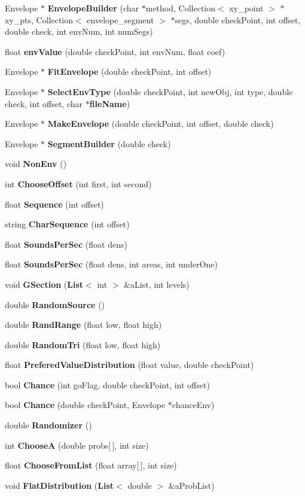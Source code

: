 \begin{CompactItemize}
\item 
Envelope $\ast$ {\bf Envelope\-Builder} (char $\ast$method, Collection$<$ xy\_\-point $>$ $\ast$xy\_\-pts, Collection$<$ envelope\_\-segment $>$ $\ast$segs, double check\-Point, int offset, double check, int env\-Num, int num\-Segs)
\item 
float {\bf env\-Value} (double check\-Point, int env\-Num, float coef)
\item 
Envelope $\ast$ {\bf Fit\-Envelope} (double check\-Point, int offset)
\item 
Envelope $\ast$ {\bf Select\-Env\-Type} (double check\-Point, int new\-Obj, int type, double check, int offset, char $\ast${\bf file\-Name})
\item 
Envelope $\ast$ {\bf Make\-Envelope} (double check\-Point, int offset, double check)
\item 
Envelope $\ast$ {\bf Segment\-Builder} (double check)
\item 
void {\bf Non\-Env} ()
\item 
int {\bf Choose\-Offset} (int first, int second)
\item 
float {\bf Sequence} (int offset)
\item 
string {\bf Char\-Sequence} (int offset)
\item 
float {\bf Sounds\-Per\-Sec} (float dens)
\item 
float {\bf Sounds\-Per\-Sec} (float dens, int areas, int under\-One)
\item 
void {\bf GSection} ({\bf List}$<$ int $>$ \&a\-List, int levels)
\item 
double {\bf Random\-Source} ()
\item 
double {\bf Rand\-Range} (float low, float high)
\item 
double {\bf Random\-Tri} (float low, float high)
\item 
float {\bf Prefered\-Value\-Distribution} (float value, double check\-Point)
\item 
bool {\bf Chance} (int go\-Flag, double check\-Point, int offset)
\item 
bool {\bf Chance} (double check\-Point, Envelope $\ast$chance\-Env)
\item 
double {\bf Randomizer} ()
\item 
int {\bf Choose\-A} (double probs[$\,$], int size)
\item 
float {\bf Choose\-From\-List} (float array[$\,$], int size)
\item 
void {\bf Flat\-Distribution} ({\bf List}$<$ double $>$ \&a\-Prob\-List)

\end{CompactItemize}

